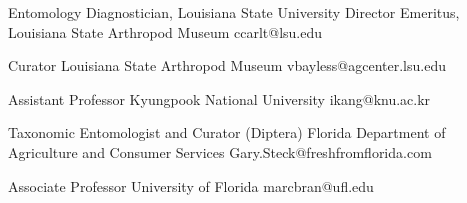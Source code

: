 \documentclass{article}
\begin{document}
{Entomology Diagnostician, Louisiana State University}
{Director Emeritus, Louisiana State Arthropod Museum}
{ccarlt@lsu.edu}

{Curator}
{Louisiana State Arthropod Museum}
{vbayless@agcenter.lsu.edu}

{Assistant Professor}
{Kyungpook National University}
{ikang@knu.ac.kr}

{Taxonomic Entomologist and Curator (Diptera)}
{Florida Department of Agriculture and Consumer Services}
{Gary.Steck@freshfromflorida.com}

{Associate Professor}
{University of Florida}
{marcbran@ufl.edu}
 
\end{document}

